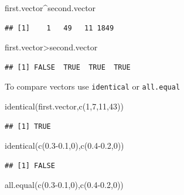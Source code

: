 \documentclass[
]{gitbook}
\newenvironment{Shaded}{\begin{snugshade}}{\end{snugshade}}
\newcommand{\DecValTok}[1]{\textcolor[rgb]{0.00,0.00,0.81}{#1}}
\newcommand{\FloatTok}[1]{\textcolor[rgb]{0.00,0.00,0.81}{#1}}
\newcommand{\FunctionTok}[1]{\textcolor[rgb]{0.00,0.00,0.00}{#1}}
\newcommand{\NormalTok}[1]{#1}
\newcommand{\SpecialCharTok}[1]{\textcolor[rgb]{0.00,0.00,0.00}{#1}}
\begin{document}
\begin{Shaded}
\begin{Highlighting}[]
\NormalTok{first.vector}\SpecialCharTok{\^{}}\NormalTok{second.vector}
\end{Highlighting}
\end{Shaded}

\begin{verbatim}
## [1]    1   49   11 1849
\end{verbatim}

\begin{Shaded}
\begin{Highlighting}[]
\NormalTok{first.vector}\SpecialCharTok{\textgreater{}}\NormalTok{second.vector}
\end{Highlighting}
\end{Shaded}

\begin{verbatim}
## [1] FALSE  TRUE  TRUE  TRUE
\end{verbatim}

To compare vectors use \texttt{identical} or \texttt{all.equal}

\begin{Shaded}
\begin{Highlighting}[]
\FunctionTok{identical}\NormalTok{(first.vector,}\FunctionTok{c}\NormalTok{(}\DecValTok{1}\NormalTok{,}\DecValTok{7}\NormalTok{,}\DecValTok{11}\NormalTok{,}\DecValTok{43}\NormalTok{))}
\end{Highlighting}
\end{Shaded}

\begin{verbatim}
## [1] TRUE
\end{verbatim}

\begin{Shaded}
\begin{Highlighting}[]
\FunctionTok{identical}\NormalTok{(}\FunctionTok{c}\NormalTok{(}\FloatTok{0.3{-}0.1}\NormalTok{,}\DecValTok{0}\NormalTok{),}\FunctionTok{c}\NormalTok{(}\FloatTok{0.4{-}0.2}\NormalTok{,}\DecValTok{0}\NormalTok{))}
\end{Highlighting}
\end{Shaded}

\begin{verbatim}
## [1] FALSE
\end{verbatim}

\begin{Shaded}
\begin{Highlighting}[]
\FunctionTok{all.equal}\NormalTok{(}\FunctionTok{c}\NormalTok{(}\FloatTok{0.3{-}0.1}\NormalTok{,}\DecValTok{0}\NormalTok{),}\FunctionTok{c}\NormalTok{(}\FloatTok{0.4{-}0.2}\NormalTok{,}\DecValTok{0}\NormalTok{))}
\end{Highlighting}
\end{Shaded}
\end{document}
